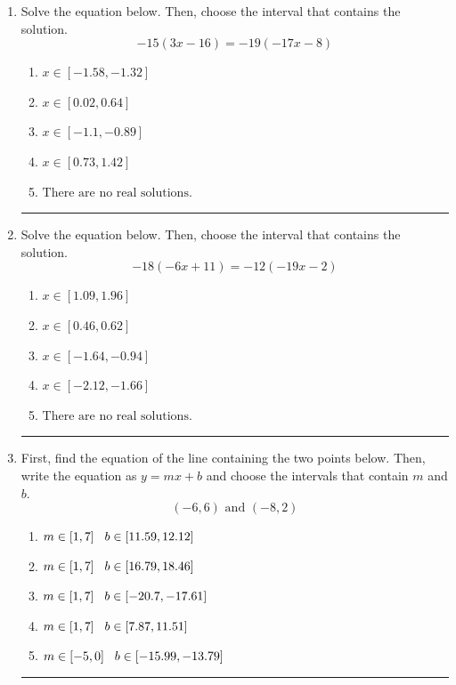 \documentclass[14pt]{extbook}
\newcommand{\litem}[1]{\item#1\hspace*{-1cm}\rule{\textwidth}{0.4pt}}
\begin{document}
\begin{enumerate}
{\begin{enumerate}[label=\Alph*.]
\end{enumerate} }
\litem{
Solve the equation below. Then, choose the interval that contains the solution.\[ -15(3x -16) = -19(-17x -8) \]\begin{enumerate}[label=\Alph*.]
\item \( x \in [-1.58, -1.32] \)
\item \( x \in [0.02, 0.64] \)
\item \( x \in [-1.1, -0.89] \)
\item \( x \in [0.73, 1.42] \)
\item \( \text{There are no real solutions.} \)

\end{enumerate} }
\litem{
Solve the equation below. Then, choose the interval that contains the solution.\[ -18(-6x + 11) = -12(-19x -2) \]\begin{enumerate}[label=\Alph*.]
\item \( x \in [1.09, 1.96] \)
\item \( x \in [0.46, 0.62] \)
\item \( x \in [-1.64, -0.94] \)
\item \( x \in [-2.12, -1.66] \)
\item \( \text{There are no real solutions.} \)

\end{enumerate} }
\litem{
First, find the equation of the line containing the two points below. Then, write the equation as $ y=mx+b $ and choose the intervals that contain $m$ and $b$.\[ (-6, 6) \text{ and } (-8, 2) \]\begin{enumerate}[label=\Alph*.]
\item \( m \in [1, 7] \hspace*{3mm} b \in [11.59, 12.12] \)
\item \( m \in [1, 7] \hspace*{3mm} b \in [16.79, 18.46] \)
\item \( m \in [1, 7] \hspace*{3mm} b \in [-20.7, -17.61] \)
\item \( m \in [1, 7] \hspace*{3mm} b \in [7.87, 11.51] \)
\item \( m \in [-5, 0] \hspace*{3mm} b \in [-15.99, -13.79] \)


\end{enumerate}}
\end{enumerate}
\end{document}
